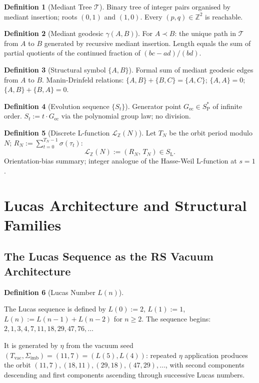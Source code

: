 \documentclass[11pt, letterpaper]{article}
\newcommand{\Z}{\mathbb{Z}}
\newcommand{\SL}{S_{\mathrm{L}}}
\newcommand{\SPs}{S_{\mathrm{P}}^{*}}
\newcommand{\aop}{\eta}
\newcommand{\LQ}{\mathcal{L}_{\mathbb{Z}}}
\newcommand{\Sigimb}{\Sigma_{\mathrm{imb}}}
\theoremstyle{definition}
\newtheorem{definition}{Definition}[section]
\theoremstyle{plain}
\begin{document}
\begin{definition}[Mediant Tree $\mathcal{T}$]\label{def:mediant-tree}
Binary tree of integer pairs organised by mediant insertion; roots $(0,1)$
and $(1,0)$.  Every $(p,q)\in\Z^2$ is reachable.
\end{definition}

\begin{definition}[Mediant geodesic $\gamma(A,B)$]\label{def:geodesic}
For $A\prec B$: the unique path in $\mathcal{T}$ from $A$ to $B$ generated
by recursive mediant insertion.  Length equals the sum of partial quotients
of the continued fraction of $(bc-ad)/(bd)$.
\end{definition}

\begin{definition}[Structural symbol $\{A,B\}$]\label{def:struct-symbol}
Formal sum of mediant geodesic edges from $A$ to $B$.  Manin-Drinfeld
relations: $\{A,B\}+\{B,C\}=\{A,C\}$; $\{A,A\}=0$; $\{A,B\}+\{B,A\}=0$.
\end{definition}

\begin{definition}[Evolution sequence $\{S_t\}$]\label{def:evol-seq}
Generator point $G_{\mathrm{ec}}\in\SPs$ of infinite order.
$S_t:=t\cdot G_{\mathrm{ec}}$ via the polynomial group law; no division.
\end{definition}

\begin{definition}[Discrete L-function $\LQ(N)$]\label{def:L-function}
Let $T_N$ be the orbit period modulo $N$;
$R_N:=\sum_{t=0}^{T_N-1}\sigma(\tau_t)$:
\[
\LQ(N):=(R_N,\,T_N)\in\SL.
\]
Orientation-bias summary; integer analogue of the Hasse-Weil L-function
at $s=1$.
\end{definition}

\newpage


\section{Lucas Architecture and Structural Families}\label{sec:lucas}

\subsection{The Lucas Sequence as the RS Vacuum Architecture}

\begin{definition}[Lucas Number $L(n)$]\label{def:lucas}
\begin{rsbox}
The Lucas sequence is defined by $L(0):=2$, $L(1):=1$,
$L(n):=L(n-1)+L(n-2)$ for $n\geq 2$.  The sequence begins:
$2,1,3,4,7,11,18,29,47,76,\ldots$

It is generated by $\aop$ from the vacuum seed
$(T_{\mathrm{vac}},\Sigimb)=(11,7)=(L(5),L(4))$: repeated $\aop$
application produces the orbit
$(11,7),(18,11),(29,18),(47,29),\ldots$, with second components descending
and first components ascending through successive Lucas numbers.
\end{rsbox}
\end{definition}
\end{document}
